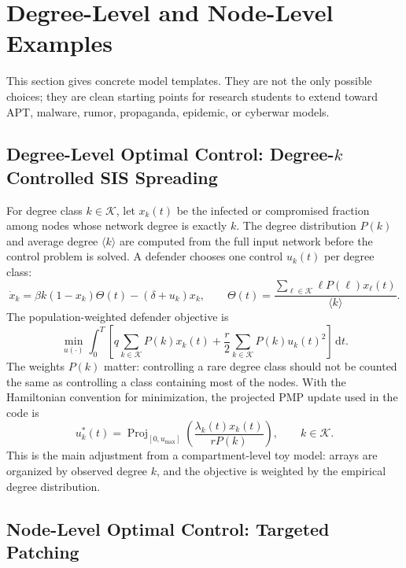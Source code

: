 \documentclass[11pt,a4paper]{article}
\newcommand{\dd}{\,\mathrm{d}}
\newcommand{\Proj}{\operatorname{Proj}}
\begin{document}
\section{Degree-Level and Node-Level Examples}

This section gives concrete model templates. They are not the only possible choices; they are clean starting points for research students to extend toward APT, malware, rumor, propaganda, epidemic, or cyberwar models.


\subsection{Degree-Level Optimal Control: Degree-\texorpdfstring{$k$}{k} Controlled SIS Spreading}

For degree class $k\in\mathcal{K}$, let $x_k(t)$ be the infected or compromised fraction among nodes whose network degree is exactly $k$. The degree distribution $P(k)$ and average degree $\langle k\rangle$ are computed from the full input network before the control problem is solved. A defender chooses one control $u_k(t)$ per degree class:
\begin{equation}
  \dot{x}_k=\beta k(1-x_k)\Theta(t)-(\delta+u_k)x_k,\qquad
  \Theta(t)=\frac{\sum_{\ell\in\mathcal{K}}\ell P(\ell)x_\ell(t)}{\langle k\rangle}.
\end{equation}
The population-weighted defender objective is
\begin{equation}
  \min_{u(\cdot)}\int_0^T\left[q\sum_{k\in\mathcal{K}}P(k)x_k(t)+\frac{r}{2}\sum_{k\in\mathcal{K}}P(k)u_k(t)^2\right]\dd t.
  \label{eq:degree-oc}
\end{equation}
The weights $P(k)$ matter: controlling a rare degree class should not be counted the same as controlling a class containing most of the nodes. With the Hamiltonian convention for minimization, the projected PMP update used in the code is
\begin{equation}
  u_k^*(t)=\Proj_{[0,u_{\max}]}
  \left(\frac{\lambda_k(t)x_k(t)}{rP(k)}\right),
  \qquad k\in\mathcal{K}.
\end{equation}
This is the main adjustment from a compartment-level toy model: arrays are organized by observed degree $k$, and the objective is weighted by the empirical degree distribution.

\subsection{Node-Level Optimal Control: Targeted Patching}
\end{document}
